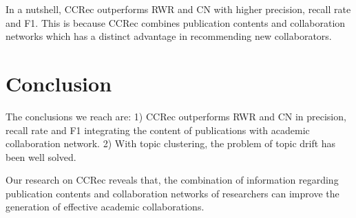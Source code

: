 \documentclass{chi-ext}
\begin{document}
In a nutshell, CCRec outperforms RWR and CN with higher precision, recall rate and F1. This is because CCRec combines publication contents and collaboration networks which has a distinct advantage in recommending new collaborators.

\section{Conclusion}
The conclusions we reach are: 1) CCRec outperforms RWR and CN in precision, recall rate and F1 integrating the content of publications with academic collaboration network. 2) With topic clustering, the problem of topic drift has been well solved.

Our research on CCRec reveals that, the combination of information regarding publication contents and collaboration networks of researchers can improve the generation of effective academic collaborations.

\balance


\end{document}
